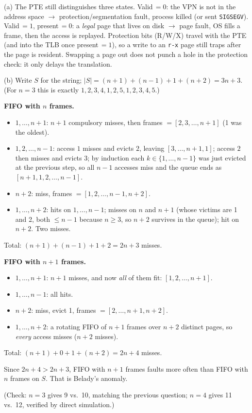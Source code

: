 \documentclass[11pt,a4paper]{article}
\newenvironment{Sol}{%
  \begin{tcolorbox}[sboxstyle, title={Solution}]%
}{%
  \end{tcolorbox}\vspace{0.35em}%
}
\begin{document}
\begin{Sol}
(a) The PTE still distinguishes three states. Valid$\,=0$: the VPN is
not in the address space $\to$ protection/segmentation fault, process
killed (or sent \texttt{SIGSEGV}). Valid$\,=1$, present$\,=0$: a
\emph{legal} page that lives on disk $\to$ page fault, OS fills a frame,
then the access is replayed. Protection bits (R/W/X) travel with the
PTE (and into the TLB once present$\,=1$), so a write to an
\texttt{r-x} page still traps after the page is resident. Swapping a
page out does not punch a hole in the protection check: it only delays
the translation.

(b) Write $S$ for the string; $|S|=(n+1)+(n-1)+1+(n+2)=3n+3$.
(For $n=3$ this is exactly $1,2,3,4,1,2,5,1,2,3,4,5$.)

\textbf{FIFO with $n$ frames.}
\begin{itemize}
  \item $1,\ldots,n+1$: $n+1$ compulsory misses, then frames
        $=[2,3,\ldots,n+1]$ (1 was the oldest).
  \item $1,2,\ldots,n-1$: access $1$ misses and evicts $2$, leaving
        $[3,\ldots,n+1,1]$; access $2$ then misses and evicts $3$; by
        induction each $k \in \{1,\ldots,n-1\}$ was just evicted at the
        previous step, so all $n-1$ accesses miss and the queue ends as
        $[n+1,1,2,\ldots,n-1]$.
  \item $n+2$: miss, frames $=[1,2,\ldots,n-1,n+2]$.
  \item $1,\ldots,n+2$: hits on $1,\ldots,n-1$; misses on $n$ and
        $n+1$ (whose victims are 1 and 2, both $\le n-1$ because
        $n \ge 3$, so $n+2$ survives in the queue); hit on $n+2$. Two
        misses.
\end{itemize}
Total: $(n+1)+(n-1)+1+2=2n+3$ misses.

\textbf{FIFO with $n+1$ frames.}
\begin{itemize}
  \item $1,\ldots,n+1$: $n+1$ misses, and now \emph{all} of them fit:
        $[1,2,\ldots,n+1]$.
  \item $1,\ldots,n-1$: all hits.
  \item $n+2$: miss, evict 1, frames $=[2,\ldots,n+1,n+2]$.
  \item $1,\ldots,n+2$: a rotating FIFO of $n+1$ frames over $n+2$
        distinct pages, so \emph{every} access misses ($n+2$ misses).
\end{itemize}
Total: $(n+1)+0+1+(n+2)=2n+4$ misses.

Since $2n+4 > 2n+3$, FIFO with $n+1$ frames faults more often than FIFO
with $n$ frames on $S$. That is Belady's anomaly.

(Check: $n=3$ gives 9 vs.\ 10, matching the previous question; $n=4$
gives 11 vs.\ 12, verified by direct simulation.)
\end{Sol}
\end{document}
